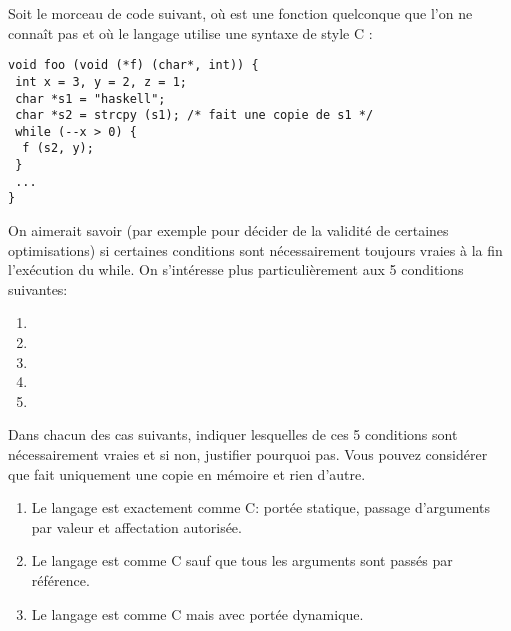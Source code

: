 \begin{Exercise}
\label{ex:fonction_raisonner2}
  Soit le morceau de code suivant, où  est une fonction
quelconque que l'on ne connaît pas et où le langage utilise une
syntaxe de style C :
\begin{verbatim}
void foo (void (*f) (char*, int)) {
 int x = 3, y = 2, z = 1;
 char *s1 = "haskell";
 char *s2 = strcpy (s1); /* fait une copie de s1 */
 while (--x > 0) {
  f (s2, y);
 }
 ...
}
\end{verbatim}
On aimerait savoir (par exemple pour décider de la validité de
certaines optimisations) si certaines conditions sont nécessairement
toujours vraies à la fin l'exécution du while.  On s'intéresse plus
particulièrement aux 5 conditions suivantes:
\begin{enumerate}
\item {}
\item {}
\item {}
\item {}
\item {}
\end{enumerate}
Dans chacun des cas suivants, indiquer lesquelles de ces 5 conditions
sont nécessairement vraies et si non, justifier pourquoi pas. Vous
pouvez considérer que  fait uniquement une copie en mémoire et
rien d'autre.
\begin{enumerate}
\item Le langage est exactement comme C: portée statique, passage d'arguments
  par valeur et affectation autorisée.
\item Le langage est comme C sauf que tous les arguments sont passés
  par référence.
\item Le langage est comme C mais avec portée dynamique.
\end{enumerate}
\end{Exercise}

